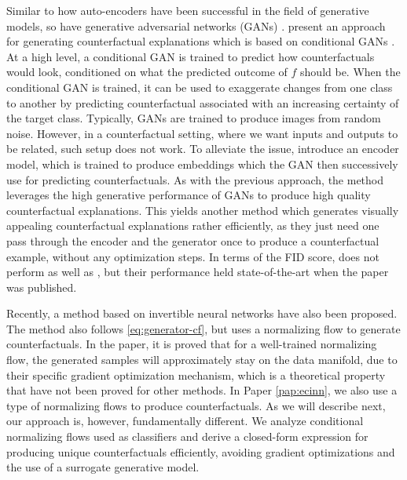 \documentclass[11pt,a4paper,twoside,openright,final]{memoir}
\newcommand*{\paperref}[1]{Paper \hyperref[#1]{\ref{#1}}}
\begin{document}
Similar to how auto-encoders have been successful in the field of generative models, so have generative adversarial networks (GANs) \cite{gans}.
\citet{Singla2019} present an approach for generating counterfactual explanations which is based on conditional GANs \cite{conditionalgan}.
At a high level, a conditional GAN is trained to predict how counterfactuals would look, conditioned on what the predicted outcome of $f$ should be. 
When the conditional GAN is trained, it can be used to exaggerate changes from one class to another by predicting counterfactual associated with an increasing certainty of the target class.
Typically, GANs are trained to produce images from random noise.
However, in a counterfactual setting, where we want inputs and outputs to be related, such setup does not work. 
To alleviate the issue, \citet{Singla2019} introduce an encoder model, which is trained to produce embeddings which the GAN then successively use for predicting counterfactuals. 
As with the previous approach, the method leverages the high generative performance of GANs to produce high quality counterfactual explanations.
This yields another method which generates visually appealing counterfactual explanations rather efficiently, as they just need one pass through the encoder and the generator once to produce a counterfactual example, without any optimization steps.  
In terms of the FID score, \cite{Singla2019} does not perform as well as \cite{Rodriguez2021}, but their performance held state-of-the-art when the paper was published.

Recently, a method based on invertible neural networks have also been proposed.
The method also follows \eqref{eq:generator-cf}, but uses a normalizing flow to generate counterfactuals. 
In the paper, it is proved that for a well-trained normalizing flow,  the generated samples will approximately stay on the data manifold, due to their specific gradient optimization mechanism, which is a theoretical property that have not been proved for other methods.
In \paperref{pap:ecinn}, we also use a type of normalizing flows to produce counterfactuals. 
As we will describe next, our approach is, however, fundamentally different. 
We analyze conditional normalizing flows used as classifiers and derive a closed-form expression for producing unique counterfactuals efficiently, avoiding gradient optimizations and the use of a surrogate generative model.
\end{document}
